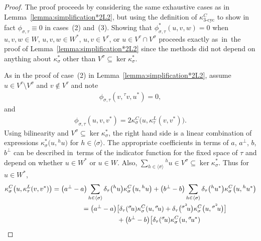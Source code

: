 \documentclass[pdftex]{sigma}
\numberwithin{equation}{section}
\newcommand{\actby}[1]{{}^{#1}}
\newcommand{\actbylessspace}[1]{{}^{#1}\!}
\DeclareMathOperator{\tri}{3-cyc}
\begin{document}
\begin{proof}
The proof proceeds by considering the same exhaustive cases as in Lemma~\ref{lemma:simplification*2L2},
but using the definition of $\kappa^C_{\tri}$ to show in fact $\phi_{\sigma,\tau}\equiv 0$ in cases~(2) and~(3).
Showing that $\phi^{*}_{\sigma,\tau}(u,v,w)=0$ when
$u,v,w \in W$, $u,v,w \in W^*$, $u,v\in V^{\tau}$, or $u \in V^{\tau}\cap V^{\sigma}$
proceeds exactly as~in~the proof of Lemma~\ref{lemma:simplification*2L2}
since the methods did not depend on anything about $\kappa^*_\sigma$ other than
$V^{\sigma} \subseteq \ker \kappa^*_{\sigma}$.

As in the proof of case~(2) in Lemma~\ref{lemma:simplification*2L2}, assume
$u \in V^{\tau} \setminus V^{\sigma}$ and $v \notin V^\tau$ and note
	\begin{gather*}
	\phi_{\sigma,\tau}(v,\actbylessspace{\tau}v,u^*)=0,
	\end{gather*}
and
	\begin{gather*}
	\phi_{\sigma,\tau}(u,v,v^*)=2\kappa^C_{\sigma}\big(u,\kappa^L_{\tau}(v,v^*)\big).
	\end{gather*}
Using bilinearity and $V^{\sigma} \subseteq \ker \kappa^*_{\sigma}$, the right hand
side is a linear combination of expressions $\kappa^*_{\sigma}\big(u,\actby{h}u\big)$ for
$h \in \langle \sigma \rangle$. The appropriate coefficients in terms of $a$, $a^\perp$, $b$, $b^\perp$
can be described in~terms of the indicator function for the fixed space of $\tau$
and depend on whether $u \in W^*$ or $u \in W$.
Also, $\sum_{h \in \langle \sigma \rangle} \actby{h}u \in V^{\sigma} \subseteq \ker \kappa^*_{\sigma}$.
Thus for $u \in W^*$,
\begin{gather*}
\kappa^C_{\sigma}\big(u,\kappa^L_{\tau}(v,v^*)\big)
=\big(a^\perp-a\big)\sum\limits_{h \in \langle \sigma \rangle}
\delta_{\tau}\big(\actby{h}u\big)\kappa^C_{\sigma}\big(u,\actby{h}u\big)
+\big(b^\perp-b\big)\sum\limits_{h \in \langle \sigma \rangle}
\delta_{\tau}\big(\actby{h}u^*\big)\kappa^C_{\sigma}\big(u,\actby{h}u^*\big)
\\ \hphantom{\kappa^C_{\sigma}\big(u,\kappa^L_{\tau}(v,v^*)\big)}
=\big(a^\perp-a\big)\big[\delta_{\tau}(\actbylessspace{\sigma}u)\kappa^C_{\sigma}(u,\actbylessspace{\sigma}u)
+\delta_{\tau}\big(\actbylessspace{\sigma^2}u\big)\kappa^C_{\sigma}\big(u,\actbylessspace{\sigma^2}u\big)\big]
\\ \hphantom{\kappa^C_{\sigma}\big(u,\kappa^L_{\tau}(v,v^*)\big)=}
\phantom{,}+\big(b^\perp-b\big)\big[\delta_{\tau}(\actbylessspace{\sigma}u)\kappa^C_{\sigma}(u,\actbylessspace{\sigma}u^*)

\end{gather*}
\end{proof}
\end{document}
